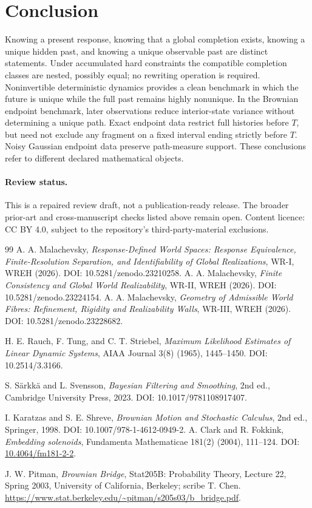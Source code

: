 \documentclass[11pt]{article}
\begin{document}
\section*{Conclusion}
Knowing a present response, knowing that a global completion exists, knowing a unique hidden past, and knowing a unique observable past are distinct statements. Under accumulated hard constraints the compatible completion classes are nested, possibly equal; no rewriting operation is required. Noninvertible deterministic dynamics provides a clean benchmark in which the future is unique while the full past remains highly nonunique. In the Brownian endpoint benchmark, later observations reduce
interior-state variance without determining a unique path. Exact
endpoint data restrict full histories before $T$, but need not exclude
any fragment on a fixed interval ending strictly before $T$. Noisy
Gaussian endpoint data preserve path-measure support. These conclusions
refer to different declared mathematical objects.

\paragraph{Review status.}
This is a repaired review draft, not a publication-ready release.
The broader prior-art and cross-manuscript checks listed above remain
open. Content licence: CC BY 4.0, subject to the repository's
third-party-material exclusions.

\begin{thebibliography}{99}
 A. A. Malachevsky, \emph{Response-Defined World Spaces: Response Equivalence, Finite-Resolution Separation, and Identifiability of Global Realizations}, WR-I, WREH (2026). DOI: 10.5281/zenodo.23210258.
 A. A. Malachevsky, \emph{Finite Consistency and Global World Realizability}, WR-II, WREH (2026). DOI: 10.5281/zenodo.23224154.
 A. A. Malachevsky, \emph{Geometry of Admissible World Fibres: Refinement, Rigidity and Realizability Walls}, WR-III, WREH (2026). DOI: 10.5281/zenodo.23228682.

H. E. Rauch, F. Tung, and C. T. Striebel,
\emph{Maximum Likelihood Estimates of Linear Dynamic Systems},
AIAA Journal 3(8) (1965), 1445--1450.
DOI: 10.2514/3.3166.

S. S\"arkk\"a and L. Svensson,
\emph{Bayesian Filtering and Smoothing}, 2nd ed.,
Cambridge University Press, 2023.
DOI: 10.1017/9781108917407.

I. Karatzas and S. E. Shreve,
\emph{Brownian Motion and Stochastic Calculus}, 2nd ed.,
Springer, 1998.
DOI: 10.1007/978-1-4612-0949-2.
A. Clark and R. Fokkink,
\emph{Embedding solenoids},
Fundamenta Mathematicae 181(2) (2004), 111--124.
DOI: \href{https://doi.org/10.4064/fm181-2-2}{10.4064/fm181-2-2}.

J. W. Pitman, \emph{Brownian Bridge},
Stat205B: Probability Theory, Lecture 22, Spring 2003,
University of California, Berkeley; scribe T. Chen.
\url{https://www.stat.berkeley.edu/~pitman/s205s03/b_bridge.pdf}.
\end{thebibliography}
\end{document}
